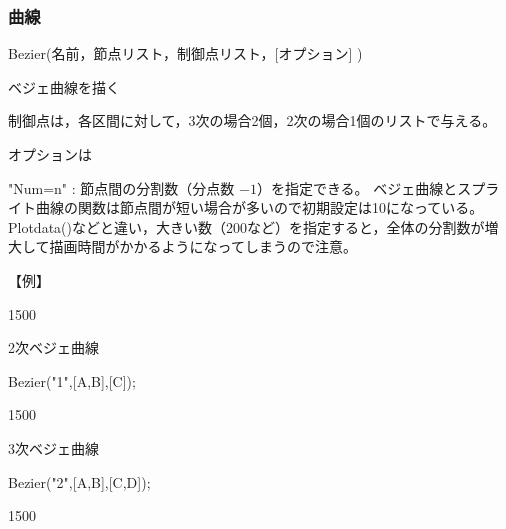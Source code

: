 \documentclass[papersize,a4paper,12pt,uplatex]{jsarticle}
\begin{document}
\subsubsection{曲線}
\begin{description}

\hypertarget{bezier}{}
\item[関数]  Bezier(名前，節点リスト，制御点リスト，[オプション] )
\item[機能]  ベジェ曲線を描く
\item[説明]  制御点は，各区間に対して，3次の場合2個，2次の場合1個のリストで与える。

オプションは

"Num=n"  : 節点間の分割数（分点数 $-1$）を指定できる。 ベジェ曲線とスプライト曲線の関数は節点間が短い場合が多いので初期設定は10になっている。Plotdata()などと違い，大きい数（200など）を指定すると，全体の分割数が増大して描画時間がかかるようになってしまうので注意。

\vspace{\baselineskip}
【例】

\begin{layer}{150}{0}
\end{layer}

2次ベジェ曲線

Bezier("1",[A,B],[C]);

\vspace{20mm}

\begin{layer}{150}{0}
\end{layer}

3次ベジェ曲線

Bezier("2",[A,B],[C,D]);

\vspace{20mm}

\begin{layer}{150}{0}
\end{layer}






\end{description}
\end{document}

